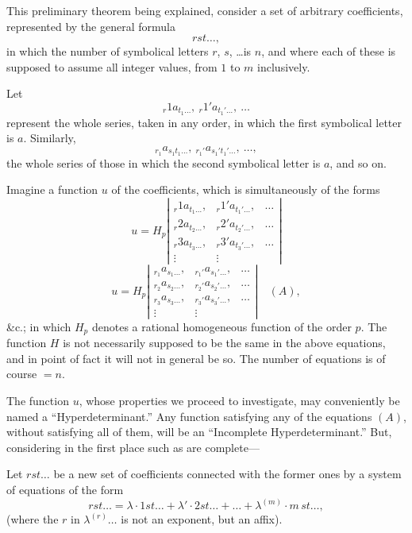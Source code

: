 \documentclass[11pt,a4paper]{article}
\theoremstyle{plain}
\theoremstyle{definition}
\theoremstyle{remark}
\begin{document}
This preliminary theorem being explained, consider a set of arbitrary coefficients,
represented by the general formula
\[
rst\ldots \tag{6},
\]
in which the number of symbolical letters $r$, $s$, \ldots is $n$, and where each of these is
supposed to assume all integer values, from $1$ to $m$ inclusively.

\newpage

Let
\[
{}_r1a_{t_1\ldots},\ {}_r1'a_{t_1'\ldots},\ \ldots
\tag{7}
\]
represent the whole series, taken in any order, in which the first symbolical letter
is $a$. Similarly,
\[
{}_{r_1}a_{s_1t_1\ldots},\ {}_{r_1'}a_{s_1't_1'\ldots},\ \ldots
\tag{8},
\]
the whole series of those in which the second symbolical letter is $a$, and so on.

Imagine a function $u$ of the coefficients, which is simultaneously of the forms
\[
u = H_p
\left|
\begin{array}{ccc}
{}_r1a_{t_1\ldots},& {}_r1'a_{t_1'\ldots},&\ldots \\
{}_r2a_{t_2\ldots},& {}_r2'a_{t_2'\ldots},&\ldots \\
{}_r3a_{t_3\ldots},& {}_r3'a_{t_3'\ldots},&\ldots \\
\vdots&\vdots
\end{array}
\right|
\]
\[
u = H_p
\left|
\begin{array}{ccc}
{}_{r_1}a_{s_1\ldots},& {}_{r_1'}a_{s_1'\ldots},&\ldots \\
{}_{r_2}a_{s_2\ldots},& {}_{r_2'}a_{s_2'\ldots},&\ldots \\
{}_{r_3}a_{s_3\ldots},& {}_{r_3'}a_{s_3'\ldots},&\ldots \\
\vdots&\vdots
\end{array}
\right|
\quad (A),
\]
\&c.; in which $H_p$ denotes a rational homogeneous function of the order $p$. The
function $H$ is not necessarily supposed to be the same in the above equations, and
in point of fact it will not in general be so. The number of equations is of course $=n$.

The function $u$, whose properties we proceed to investigate, may conveniently be
named a ``Hyperdeterminant.'' Any function satisfying any of the equations $(A)$,
without satisfying all of them, will be an ``Incomplete Hyperdeterminant.'' But,
considering in the first place such as are complete---

Let $rst\ldots$ be a new set of coefficients connected with the former ones by a system
of equations of the form
\[
rst\ldots = \lambda\cdot 1st\ldots + \lambda'\cdot 2st\ldots + \ldots + \lambda^{(m)}\cdot m\,st\ldots
\tag{9},
\]
(where the $r$ in $\lambda^{(r)}\ldots$ is not an exponent, but an affix).
\end{document}
